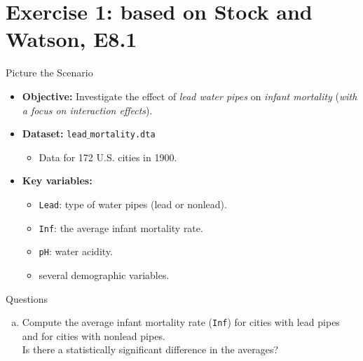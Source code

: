 \documentclass[
  10pt,
  ignorenonframetext,
]{beamer}
\providecommand{\tightlist}{%
  \setlength{\itemsep}{0pt}\setlength{\parskip}{0pt}}
\begin{document}
\hypertarget{exercise-1-based-on-stock-and-watson-e8.1}{%
\section{Exercise 1: based on Stock and Watson,
E8.1}\label{exercise-1-based-on-stock-and-watson-e8.1}}

\begin{frame}[fragile]{Picture the Scenario}
\protect\hypertarget{picture-the-scenario-2}{}
\begin{itemize}
\tightlist
\item
  \textbf{Objective:} Investigate the effect of \emph{lead water pipes}
  on \emph{infant mortality} (\emph{with a focus on interaction
  effects}).
\end{itemize}

\vspace{0.8mm}

\begin{itemize}
\tightlist
\item
  \textbf{Dataset:} \texttt{lead$\_$mortality.dta}

  \begin{itemize}
  \tightlist
  \item
    Data for 172 U.S. cities in 1900.
  \end{itemize}
\end{itemize}

\vspace{0.8mm}

\begin{itemize}
\tightlist
\item
  \textbf{Key variables:}

  \begin{itemize}
  \tightlist
  \item
    \texttt{Lead}: type of water pipes (lead or nonlead).
  \item
    \texttt{Inf}: the average infant mortality rate.
  \item
    \texttt{pH}: water acidity.
  \item
    several demographic variables.
  \end{itemize}
\end{itemize}
\end{frame}

\begin{frame}[fragile]{Questions}
\protect\hypertarget{questions-2}{}
\begin{enumerate}
[(a)]
\tightlist
\item
  Compute the average infant mortality rate (\texttt{Inf}) for cities
  with lead pipes and for cities with nonlead pipes.\\
  Is there a statistically significant difference in the averages?
\end{enumerate}
\end{frame}
\end{document}
